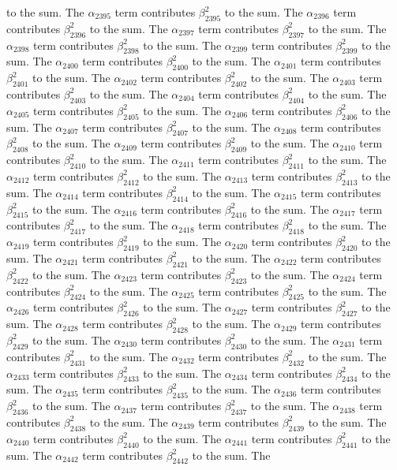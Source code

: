 \begin{lemma}
to the sum. The $\alpha_{2395}$ term contributes $\beta_{2395}^{2}$ to the sum. The $\alpha_{2396}$ term contributes $\beta_{2396}^{2}$ to the sum. The $\alpha_{2397}$ term contributes $\beta_{2397}^{2}$ to the sum. The $\alpha_{2398}$ term contributes $\beta_{2398}^{2}$ to the sum. The $\alpha_{2399}$ term contributes $\beta_{2399}^{2}$ to the sum. The $\alpha_{2400}$ term contributes $\beta_{2400}^{2}$ to the sum. The $\alpha_{2401}$ term contributes $\beta_{2401}^{2}$ to the sum. The $\alpha_{2402}$ term contributes $\beta_{2402}^{2}$ to the sum. The $\alpha_{2403}$ term contributes $\beta_{2403}^{2}$ to the sum. The $\alpha_{2404}$ term contributes $\beta_{2404}^{2}$ to the sum. The $\alpha_{2405}$ term contributes $\beta_{2405}^{2}$ to the sum. The $\alpha_{2406}$ term contributes $\beta_{2406}^{2}$ to the sum. The $\alpha_{2407}$ term contributes $\beta_{2407}^{2}$ to the sum. The $\alpha_{2408}$ term contributes $\beta_{2408}^{2}$ to the sum. The $\alpha_{2409}$ term contributes $\beta_{2409}^{2}$ to the sum. The $\alpha_{2410}$ term contributes $\beta_{2410}^{2}$ to the sum. The $\alpha_{2411}$ term contributes $\beta_{2411}^{2}$ to the sum. The $\alpha_{2412}$ term contributes $\beta_{2412}^{2}$ to the sum. The $\alpha_{2413}$ term contributes $\beta_{2413}^{2}$ to the sum. The $\alpha_{2414}$ term contributes $\beta_{2414}^{2}$ to the sum. The $\alpha_{2415}$ term contributes $\beta_{2415}^{2}$ to the sum. The $\alpha_{2416}$ term contributes $\beta_{2416}^{2}$ to the sum. The $\alpha_{2417}$ term contributes $\beta_{2417}^{2}$ to the sum. The $\alpha_{2418}$ term contributes $\beta_{2418}^{2}$ to the sum. The $\alpha_{2419}$ term contributes $\beta_{2419}^{2}$ to the sum. The $\alpha_{2420}$ term contributes $\beta_{2420}^{2}$ to the sum. The $\alpha_{2421}$ term contributes $\beta_{2421}^{2}$ to the sum. The $\alpha_{2422}$ term contributes $\beta_{2422}^{2}$ to the sum. The $\alpha_{2423}$ term contributes $\beta_{2423}^{2}$ to the sum. The $\alpha_{2424}$ term contributes $\beta_{2424}^{2}$ to the sum. The $\alpha_{2425}$ term contributes $\beta_{2425}^{2}$ to the sum. The $\alpha_{2426}$ term contributes $\beta_{2426}^{2}$ to the sum. The $\alpha_{2427}$ term contributes $\beta_{2427}^{2}$ to the sum. The $\alpha_{2428}$ term contributes $\beta_{2428}^{2}$ to the sum. The $\alpha_{2429}$ term contributes $\beta_{2429}^{2}$ to the sum. The $\alpha_{2430}$ term contributes $\beta_{2430}^{2}$ to the sum. The $\alpha_{2431}$ term contributes $\beta_{2431}^{2}$ to the sum. The $\alpha_{2432}$ term contributes $\beta_{2432}^{2}$ to the sum. The $\alpha_{2433}$ term contributes $\beta_{2433}^{2}$ to the sum. The $\alpha_{2434}$ term contributes $\beta_{2434}^{2}$ to the sum. The $\alpha_{2435}$ term contributes $\beta_{2435}^{2}$ to the sum. The $\alpha_{2436}$ term contributes $\beta_{2436}^{2}$ to the sum. The $\alpha_{2437}$ term contributes $\beta_{2437}^{2}$ to the sum. The $\alpha_{2438}$ term contributes $\beta_{2438}^{2}$ to the sum. The $\alpha_{2439}$ term contributes $\beta_{2439}^{2}$ to the sum. The $\alpha_{2440}$ term contributes $\beta_{2440}^{2}$ to the sum. The $\alpha_{2441}$ term contributes $\beta_{2441}^{2}$ to the sum. The $\alpha_{2442}$ term contributes $\beta_{2442}^{2}$ to the sum. The 
\end{lemma}
